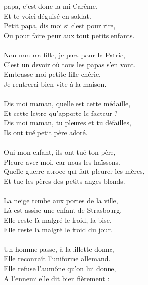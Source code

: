 
 papa, c'est donc la mi-Carême,
\\Et te voici déguisé en soldat.
\\Petit papa, dis moi si c'est pour rire,
\\Ou pour faire peur aux tout petits enfants. \bissimple
\\\\Non non ma fille, je pars pour la Patrie,
\\C'est un devoir où tous les papas s'en vont.
\\Embrasse moi petite fille chérie,
\\Je rentrerai bien vite à la maison. \bissimple
\\\\Dis moi maman, quelle est cette médaille,
\\Et cette lettre qu'apporte le facteur ?
\\Dis moi maman, tu pleures et tu défailles,
\\Ils ont tué petit père adoré. \bissimple
\\\\Oui mon enfant, ils ont tué ton père,
\\Pleure avec moi, car nous les haïssons.
\\Quelle guerre atroce qui fait pleurer les mères,
\\Et tue les pères des petits anges blonds. \bissimple
\\\\La neige tombe aux portes de la ville,
\\Là est assise une enfant de Strasbourg.
\\Elle reste là malgré le froid, la bise,
\\Elle reste là malgré le froid du jour. \bissimple
\\\\Un homme passe, à la fillette donne,
\\Elle reconnaît l'uniforme allemand.
\\Elle refuse l'aumône qu'on lui donne,
\\A l'ennemi elle dit bien fièrement : \bissimple
